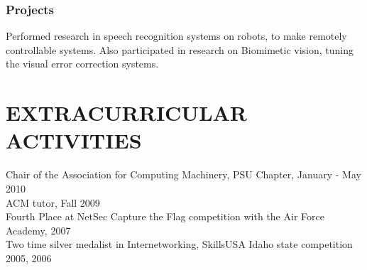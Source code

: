 \documentclass{res}
\begin{document}
\begin{resume}
  \subsubsection{Projects}
  \vspace{-0.2in}
    Performed research in speech recognition systems on robots, to make
    remotely controllable systems. Also participated in research on Biomimetic
    vision, tuning the visual error correction systems.

\vspace{-0.1in}
\section{EXTRACURRICULAR ACTIVITIES}
    Chair of the Association for Computing Machinery, PSU Chapter, January - May 2010 \\
    ACM tutor, Fall 2009 \\
    Fourth Place at NetSec Capture the Flag competition with the Air Force Academy, 2007 \\
    Two time silver medalist in Internetworking, SkillsUSA Idaho state competition 2005, 2006 \\

\end{resume}
\end{document}

